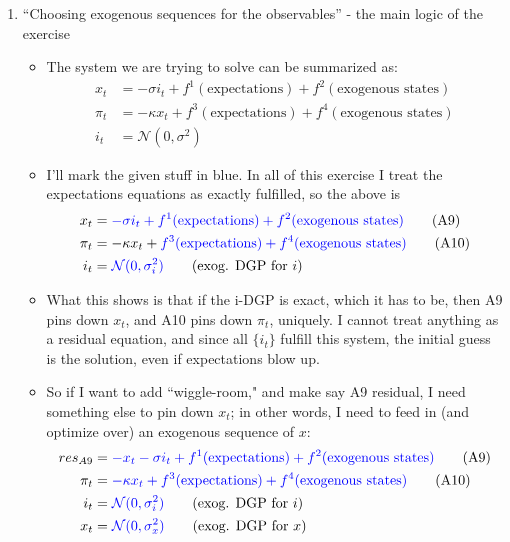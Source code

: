\documentclass[11pt]{article}
\renewcommand{\[}{\begin{equation}}
\renewcommand{\]}{\end{equation}}
\begin{document}
\begin{enumerate}
\item ``Choosing exogenous sequences for the observables'' - the main logic of the exercise
\begin{itemize}
\item The system we are trying to solve can be summarized as:
\begin{align}
x_t & = -\sigma i_t + f^1(\text{expectations}) + f^2(\text{exogenous states}) \tag{A9} \\
\pi_t & = -\kappa x_t + f^3(\text{expectations}) + f^4(\text{exogenous states}) \tag{A10} \\
i_t & = \mathcal{N}(0,\sigma^2) \tag{exog. DGP for $i$}
\end{align}
\item I'll mark the given stuff in blue. In all of this exercise I treat the expectations equations as exactly fulfilled, so the above is
\begin{align}
x_t & = \textcolor{blue}{-\sigma i_t + f^1(\text{expectations}) + f^2(\text{exogenous states})} \tag{A9} \\
\pi_t & = -\kappa x_t + \textcolor{blue}{f^3(\text{expectations}) + f^4(\text{exogenous states})} \tag{A10} \\
i_t & = \textcolor{blue}{\mathcal{N}(0,\sigma_i^2)} \tag{exog. DGP for $i$}
\end{align}
\item What this shows is that if the i-DGP is exact, which it has to be, then A9 pins down $x_t$, and A10 pins down $\pi_t$, uniquely. I cannot treat anything as a residual equation, and since all $\{i_t\}$ fulfill this system, the initial guess is the solution, even if expectations blow up.
\item So if I want to add ``wiggle-room," and make say A9 residual, I need something else to pin down $x_t$; in other words, I need to feed in (and optimize over) an exogenous sequence of $x$:
\begin{align}
res_{A9}& = \textcolor{blue}{- x_t -\sigma i_t + f^1(\text{expectations}) + f^2(\text{exogenous states})} \tag{A9} \\
\pi_t & =   \textcolor{blue}{-\kappa x_t + f^3(\text{expectations}) + f^4(\text{exogenous states})} \tag{A10} \\
i_t & = \textcolor{blue}{\mathcal{N}(0,\sigma_i^2)} \tag{exog. DGP for $i$}\\
x_t & = \textcolor{blue}{\mathcal{N}(0,\sigma_x^2)} \tag{exog. DGP for $x$}
\end{align}

\end{itemize}
\end{enumerate}
\end{document}
